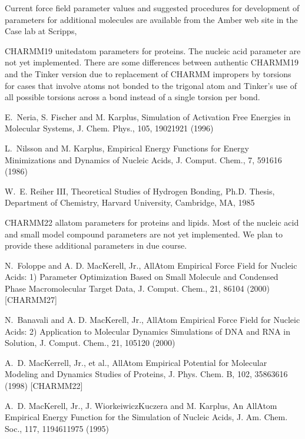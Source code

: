 \documentclass[letterpaper,11pt,english]{sphinxmanual}
\begin{document}
Current force field parameter values and suggested procedures for development of parameters for additional molecules are available from the Amber web site in the Case lab at Scripps, 


CHARMM19 united\sphinxhyphen{}atom parameters for proteins. The nucleic acid parameter are not yet implemented. There are some differences between authentic CHARMM19 and the Tinker version due to replacement of CHARMM impropers by torsions for cases that involve atoms not bonded to the trigonal atom and Tinker’s use of all possible torsions across a bond instead of a single torsion per bond.

E. Neria, S. Fischer and M. Karplus, Simulation of Activation Free Energies in Molecular Systems, J. Chem. Phys., 105, 1902\sphinxhyphen{}1921 (1996)

L. Nilsson and M. Karplus, Empirical Energy Functions for Energy Minimizations and Dynamics of Nucleic Acids, J. Comput. Chem., 7, 591\sphinxhyphen{}616 (1986)

W. E. Reiher III, Theoretical Studies of Hydrogen Bonding, Ph.D. Thesis, Department of Chemistry, Harvard University, Cambridge, MA, 1985


CHARMM22 all\sphinxhyphen{}atom parameters for proteins and lipids. Most of the nucleic acid and small model compound parameters are not yet implemented. We plan to provide these additional parameters in due course.

N. Foloppe and A. D. MacKerell, Jr., All\sphinxhyphen{}Atom Empirical Force Field for Nucleic Acids: 1) Parameter Optimization Based on Small Molecule and Condensed Phase Macromolecular Target Data, J. Comput. Chem., 21, 86\sphinxhyphen{}104 (2000)  {[}CHARMM27{]}

N. Banavali and A. D. MacKerell, Jr., All\sphinxhyphen{}Atom Empirical Force Field for Nucleic Acids: 2) Application to Molecular Dynamics Simulations of DNA and RNA in Solution, J. Comput. Chem., 21, 105\sphinxhyphen{}120 (2000)

A. D. MacKerrell, Jr., et al., All\sphinxhyphen{}Atom Empirical Potential for Molecular Modeling and Dynamics Studies of Proteins, J. Phys. Chem. B, 102, 3586\sphinxhyphen{}3616 (1998)  {[}CHARMM22{]}

A. D. MacKerell, Jr., J. Wiorkeiwicz\sphinxhyphen{}Kuczera and M. Karplus, An All\sphinxhyphen{}Atom Empirical Energy Function for the Simulation of Nucleic Acids, J. Am. Chem. Soc., 117, 11946\sphinxhyphen{}11975 (1995)
\end{document}
